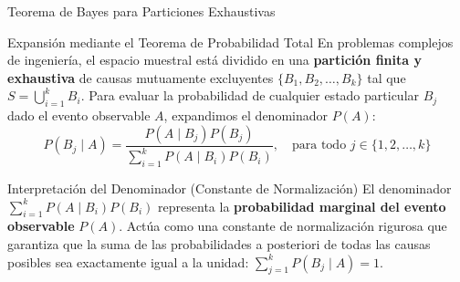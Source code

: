 \documentclass[10pt, aspectratio=169]{beamer}
\begin{document}
\begin{frame}{Teorema de Bayes para Particiones Exhaustivas}
  \fontsize{7.5pt}{9pt}\selectfont
  \begin{block}{Expansión mediante el Teorema de Probabilidad Total}
    \fontsize{7.5pt}{9pt}\selectfont
    En problemas complejos de ingeniería, el espacio muestral está dividido en una \textbf{partición finita y exhaustiva} de causas mutuamente excluyentes $\{B_1, B_2, \ldots, B_k\}$ tal que $S = \bigcup_{i=1}^k B_i$. Para evaluar la probabilidad de cualquier estado particular $B_j$ dado el evento observable $A$, expandimos el denominador $P(A)$:
    $$P(B_j \mid A) = \frac{P(A \mid B_j)P(B_j)}{\sum_{i=1}^k P(A \mid B_i)P(B_i)}, \quad \text{para todo } j \in \{1, 2, \ldots, k\}$$
  \end{block}
  \vspace{-0.15cm}
  \pause
  \begin{alertblock}{Interpretación del Denominador (Constante de Normalización)}
    \fontsize{7.5pt}{9pt}\selectfont
    El denominador $\sum_{i=1}^k P(A \mid B_i)P(B_i)$ representa la \textbf{probabilidad marginal del evento observable} $P(A)$. Actúa como una constante de normalización rigurosa que garantiza que la suma de las probabilidades a posteriori de todas las causas posibles sea exactamente igual a la unidad: $\sum_{j=1}^k P(B_j \mid A) = 1$.
  \end{alertblock}
\end{frame}
\end{document}
